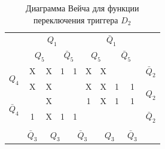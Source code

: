 \documentclass[a4paper,14pt]{article}
\begin{document}
\begin{table}[H]
	\begin{center}
		\caption{\label{tab:D2_tab} Диаграмма Вейча для функции переключения триггера $D_2$ }
		\begin{tabular}{cccccccccc}
			& \multicolumn{4}{c}{$Q_1$} & \multicolumn{4}{c}{$\bar{Q}_1$} &  \\
			& \multicolumn{2}{c}{$Q_5$} & \multicolumn{2}{c}{$\bar{Q}_5$} & \multicolumn{2}{c}{$Q_5$} & \multicolumn{2}{c}{$\bar{Q}_5$} &  \\ \cline{2-9}
			\multicolumn{1}{c|}{\multirow{2}{*}{$Q_4$}} & \multicolumn{1}{c|}{X} & \multicolumn{1}{c|}{X} & \multicolumn{1}{c|}{1} & \multicolumn{1}{c|}{1} & \multicolumn{1}{c|}{X} & \multicolumn{1}{c|}{X} & \multicolumn{1}{c|}{} & \multicolumn{1}{c|}{} & $\bar{Q}_2$ \\ \cline{2-9}
			\multicolumn{1}{c|}{} & \multicolumn{1}{c|}{X} & \multicolumn{1}{c|}{X} & \multicolumn{1}{c|}{} & \multicolumn{1}{c|}{} & \multicolumn{1}{c|}{X} & \multicolumn{1}{c|}{X} & \multicolumn{1}{c|}{1} & \multicolumn{1}{c|}{1} & \multirow{2}{*}{$Q_2$} \\ \cline{2-9}
			\multicolumn{1}{c|}{\multirow{2}{*}{$\bar{Q}_4$}} & \multicolumn{1}{c|}{} & \multicolumn{1}{c|}{X} & \multicolumn{1}{c|}{} & \multicolumn{1}{c|}{} & \multicolumn{1}{c|}{1} & \multicolumn{1}{c|}{X} & \multicolumn{1}{c|}{1} & \multicolumn{1}{c|}{1} &  \\ \cline{2-9}
			\multicolumn{1}{c|}{} & \multicolumn{1}{c|}{1} & \multicolumn{1}{c|}{X} & \multicolumn{1}{c|}{1} & \multicolumn{1}{c|}{1} & \multicolumn{1}{c|}{} & \multicolumn{1}{c|}{} & \multicolumn{1}{c|}{} & \multicolumn{1}{c|}{} & $\bar{Q}_2$ \\ \cline{2-9}
			&  & \multicolumn{2}{c}{} & \multicolumn{2}{c}{} & \multicolumn{2}{c}{} &  &  \\
			& $\bar{Q}_3$ & \multicolumn{2}{c}{$Q_3$} & \multicolumn{2}{c}{$\bar{Q}_3$} & \multicolumn{2}{c}{$Q_3$} & $\bar{Q}_3$ & 
	\end{tabular}
	\end{center}
\end{table}

\end{document}

